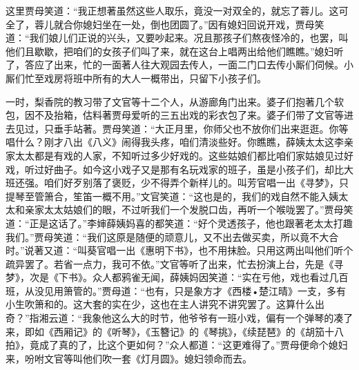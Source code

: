 \begin{parag}


    这里贾母笑道：“我正想著虽然这些人取乐，竟没一对双全的，就忘了蓉儿。这可全了，蓉儿就合你媳妇坐在一处，倒也团圆了。”因有媳妇回说开戏，贾母笑道：“我们娘儿们正说的兴头，又要吵起来。况且那孩子们熬夜怪冷的，也罢，叫他们且歇歇，把咱们的女孩子们叫了来，就在这台上唱两出给他们瞧瞧。”媳妇听了，答应了出来，忙的一面著人往大观园去传人，一面二门口去传小厮们伺候。小厮们忙至戏房将班中所有的大人一概带出，只留下小孩子们。
\end{parag}


\begin{parag}


    一时，梨香院的教习带了文官等十二个人，从游廊角门出来。婆子们抱著几个软包，因不及抬箱，估料著贾母爱听的三五出戏的彩衣包了来。婆子们带了文官等进去见过，只垂手站著。贾母笑道：“大正月里，你师父也不放你们出来逛逛。你等唱什么？刚才八出《八义》闹得我头疼，咱们清淡些好。你瞧瞧，薛姨太太这李亲家太太都是有戏的人家，不知听过多少好戏的。这些姑娘们都比咱们家姑娘见过好戏，听过好曲子。如今这小戏子又是那有名玩戏家的班子，虽是小孩子们，却比大班还强。咱们好歹别落了褒贬，少不得弄个新样儿的。叫芳官唱一出《寻梦》，只提琴至管箫合，笙笛一概不用。”文官笑道：“这也是的，我们的戏自然不能入姨太太和亲家太太姑娘们的眼，不过听我们一个发脱口齿，再听一个喉咙罢了。”贾母笑道：“正是这话了。”李婶薛姨妈喜的都笑道：“好个灵透孩子，他也跟著老太太打趣我们。”贾母笑道：“我们这原是随便的顽意儿，又不出去做买卖，所以竟不大合时。”说著又道：“叫葵官唱一出《惠明下书》，也不用抹脸。只用这两出叫他们听个疏异罢了。若省一点力，我可不依。”文官等听了出来，忙去扮演上台，先是《寻梦》，次是《下书》。众人都鸦雀无闻，薛姨妈因笑道：“实在亏他，戏也看过几百班，从没见用箫管的。”贾母道：“也有，只是象方才《西楼•楚江晴》一支，多有小生吹箫和的。这大套的实在少，这也在主人讲究不讲究罢了。这算什么出奇？”指湘云道：“我象他这么大的时节，他爷爷有一班小戏，偏有一个弹琴的凑了来，即如《西厢记》的《听琴》，《玉簪记》的《琴挑》，《续琵琶》的《胡笳十八拍》，竟成了真的了，比这个更如何？”众人都道：“这更难得了。”贾母便命个媳妇来，吩咐文官等叫他们吹一套《灯月圆》。媳妇领命而去。
\end{parag}


